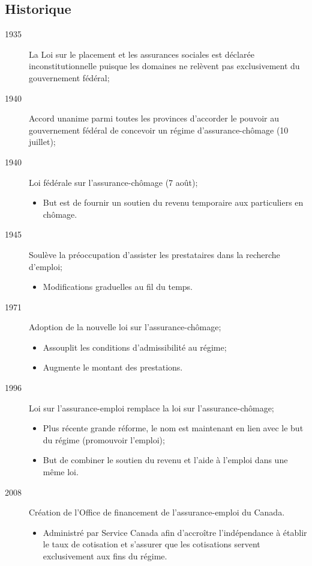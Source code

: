 \documentclass[10pt, french]{article}
\begin{document}
\begin{multicols*}{3}
\subsection*{Historique}
\begin{description}
	\item[1935]	La Loi sur le placement et les assurances sociales est déclarée inconstitutionnelle puisque les domaines ne relèvent pas exclusivement du gouvernement fédéral;
	\item[1940]	Accord unanime parmi toutes les provinces d'accorder le pouvoir au gouvernement fédéral de concevoir un régime d'assurance-chômage (10 juillet);
	\item[1940]	Loi \textcolor{bulgarianrose}{fédérale} sur l'assurance-chômage (7 août);
		\begin{itemize}[leftmargin =*]
		\item	But est de fournir un soutien du revenu temporaire aux particuliers en chômage.
		\end{itemize}
	\item[1945]	Soulève la préoccupation d'assister les prestataires dans la recherche d'emploi;
		\begin{itemize}[leftmargin =*]
		\item	Modifications graduelles au fil du temps.
		\end{itemize}
	\item[1971]	Adoption de la nouvelle loi sur l'assurance-chômage;
		\begin{itemize}[leftmargin =*]
		\item	Assouplit les conditions d'admissibilité au régime;
		\item	Augmente le montant des prestations.
		\end{itemize}
	\item[1996]	Loi sur l'assurance-emploi remplace la loi sur l'assurance-chômage;
		\begin{itemize}[leftmargin =*]
		\item	Plus récente grande réforme, le nom est maintenant en lien avec le but du régime (promouvoir l'emploi);
		\item	But de combiner le soutien du revenu et l'aide à l'emploi dans une même loi.
		\end{itemize}
	\item[2008]	Création de l'Office de financement de l'assurance-emploi du Canada.
		\begin{itemize}[leftmargin =*]
		\item	Administré par Service Canada afin d'accroître l'indépendance à établir le taux de cotisation et s'assurer que les cotisations servent exclusivement aux fins du régime.
		\end{itemize}
\end{description}


\end{multicols*}
\end{document}
